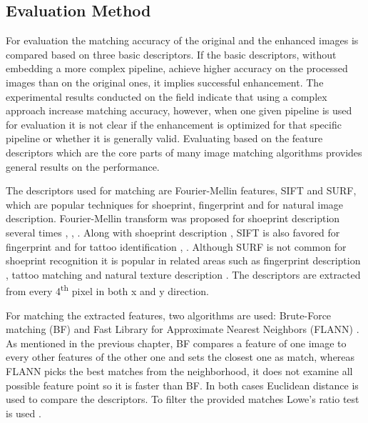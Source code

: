 \documentclass[draft,final]{vutinfth} %
\begin{document}
\subsection{Evaluation Method}
\par
For evaluation the matching accuracy of the original and the enhanced images is compared based on three basic descriptors.
If the basic descriptors, without embedding  a more complex pipeline, achieve higher accuracy on the processed  images than on the original ones, it implies successful enhancement. 
The experimental results conducted on the field indicate \cite{rida2019forensic} that using a complex approach increase matching accuracy, however, when one given pipeline is used for evaluation it is not clear if the enhancement is optimized for that specific pipeline or whether it is generally valid.
Evaluating based on the feature descriptors which are the core parts of many image matching algorithms provides general results on the performance.
\par
The descriptors used for matching are Fourier-Mellin features, SIFT and SURF, which are popular techniques for shoeprint, fingerprint and for natural image description.
Fourier-Mellin transform was proposed for shoeprint description several times \cite{gueham2008automatic}, \cite{richetelli2017classification}, \cite{wu2019crime}.
Along with shoeprint description \cite{nibouche2009rotation}, \cite{richetelli2017classification} SIFT is also favored for fingerprint \cite{zhou2011adaptive} and for tattoo identification \cite{yi2015impact}, \cite{han2013tattoo}.
Although SURF is not common for shoeprint recognition it is popular in related areas such as fingerprint description \cite{jahan2017robust}, tattoo matching \cite{yi2015impact} and natural texture description \cite{prabhakar2012lbp}.
The descriptors are extracted from every 4\textsuperscript{th} pixel in both x and y direction.
\par
For matching the extracted features, two algorithms are used: Brute-Force matching (BF) \cite{schaeffer1993re} and Fast Library for Approximate Nearest Neighbors (FLANN) \cite{muja2009fast}.
As mentioned in the previous chapter, BF compares a feature of one image to every other features of the other one and sets the closest one as match, whereas FLANN picks the best matches from the neighborhood, it does not examine all possible feature point so it is faster than BF.
In both cases Euclidean distance is used to compare the descriptors.
To filter the provided matches Lowe's ratio test is used \cite{lowe2004distinctive}.
\end{document}
